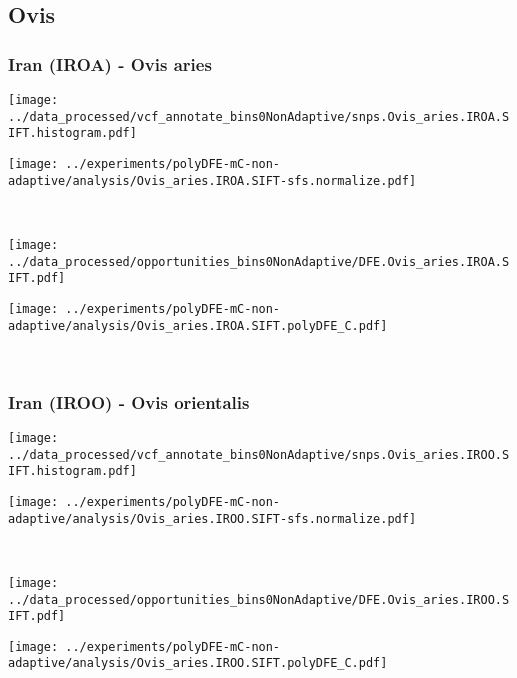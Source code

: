 \subsection{Ovis}

\subsubsection{Iran (IROA) - Ovis aries}

\begin{minipage}{0.49\linewidth}
    \texttt{[image: ../data\_processed/vcf\_annotate\_bins0NonAdaptive/snps.Ovis\_aries.IROA.SIFT.histogram.pdf]}
\end{minipage}
\begin{minipage}{0.49\linewidth}
    \texttt{[image: ../experiments/polyDFE-mC-non-adaptive/analysis/Ovis\_aries.IROA.SIFT-sfs.normalize.pdf]}
\end{minipage}
\\
\begin{minipage}{0.49\linewidth}
    \texttt{[image: ../data\_processed/opportunities\_bins0NonAdaptive/DFE.Ovis\_aries.IROA.SIFT.pdf]}
\end{minipage}
\begin{minipage}{0.49\linewidth}
    \texttt{[image: ../experiments/polyDFE-mC-non-adaptive/analysis/Ovis\_aries.IROA.SIFT.polyDFE\_C.pdf]}
\end{minipage}
\\

\subsubsection{Iran (IROO) - Ovis orientalis}

\begin{minipage}{0.49\linewidth}
    \texttt{[image: ../data\_processed/vcf\_annotate\_bins0NonAdaptive/snps.Ovis\_aries.IROO.SIFT.histogram.pdf]}
\end{minipage}
\begin{minipage}{0.49\linewidth}
    \texttt{[image: ../experiments/polyDFE-mC-non-adaptive/analysis/Ovis\_aries.IROO.SIFT-sfs.normalize.pdf]}
\end{minipage}
\\
\begin{minipage}{0.49\linewidth}
    \texttt{[image: ../data\_processed/opportunities\_bins0NonAdaptive/DFE.Ovis\_aries.IROO.SIFT.pdf]}
\end{minipage}
\begin{minipage}{0.49\linewidth}
    \texttt{[image: ../experiments/polyDFE-mC-non-adaptive/analysis/Ovis\_aries.IROO.SIFT.polyDFE\_C.pdf]}
\end{minipage}
\\

